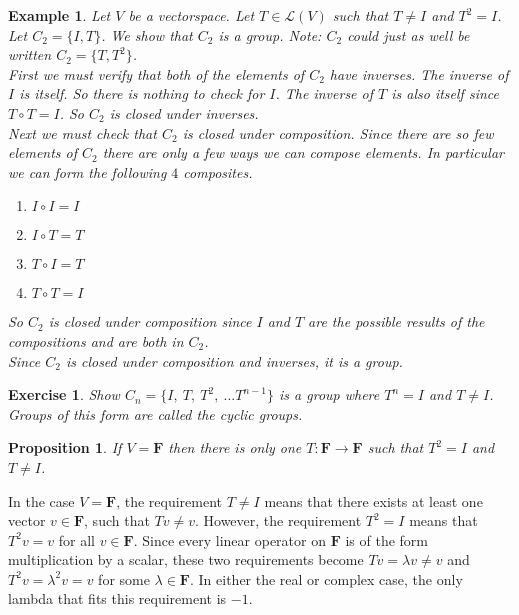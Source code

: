 \documentclass{article}
\theoremstyle{problemstyle}
\newtheorem{proposition}{Proposition}
\newtheorem{example}{Example}
\newtheorem{exercise}{Exercise}
\begin{document}
\begin{example}
Let $V$ be a vectorspace. Let $T \in \mathscr{L}(V)$ such that $T \neq I$ and $T^2 = I$. Let $C_2 = \{I, T\}$. We show that $C_2$ is a group. Note: $C_2$ could just as well be written $C_2 = \{T, T^2\}$.\\ 

First we must verify that both of the elements of $C_2$ have inverses. The inverse of $I$ is itself. So there is nothing to check for $I$. The inverse of $T$ is also itself since $T \circ T = I$. So $C_2$ is closed under inverses.\\

Next we must check that $C_2$ is closed under composition. Since there are so few elements of $C_2$ there are only a few ways we can compose elements. In particular we can form the following $4$ composites. \begin{enumerate}
\item $I \circ I = I$
\item $I \circ T = T$
\item $T \circ I = T$
\item $T \circ T = I$
\end{enumerate}
So $C_2$ is closed under composition since $I$ and $T$ are the possible results of the compositions and are both in $C_2$.\\

Since $C_2$ is closed under composition and inverses, it is a group. 
\end{example}

\begin{exercise}
Show $C_n = \{I,\ T, \ T^2, \ ... T^{n-1}\}$ is a group where $T^n = I$ and $T \neq I$. Groups of this form are called the cyclic groups. 
\end{exercise}

\begin{proposition}
If $V = \textbf{F}$ then there is only one $T:\textbf{F} \rightarrow \textbf{F}$ such that $T^2 = I$ and $T \neq I$.  
\end{proposition}

In the case $V = \textbf{F}$, the requirement $T \neq I$ means that there exists at least one vector $v \in \textbf{F}$, such that $Tv \neq v$. However, the requirement $T^2 = I$ means that $T^2v = v$ for all $v \in \textbf{F}$. Since every linear operator on $\textbf{F}$ is of the form multiplication by a scalar, these two requirements become $Tv = \lambda v \neq v$ and $T^2v = \lambda^2v = v$ for some $\lambda \in \textbf{F}$. In either the real or complex case, the only lambda that fits this requirement is $-1$. 
\end{document}
